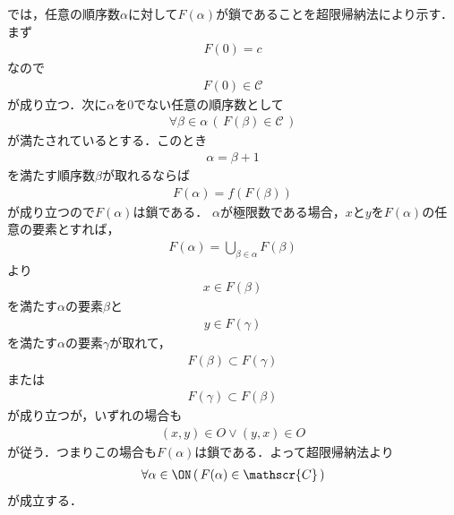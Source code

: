 \begin{sketch}
\begin{description}
				では，任意の順序数$\alpha$に対して$F(\alpha)$が鎖であることを超限帰納法により示す．まず
				\begin{align}
					F(0) = c
				\end{align}
				なので
				\begin{align}
					F(0) \in \mathscr{C}
				\end{align}
				が成り立つ．次に$\alpha$を$0$でない任意の順序数として
				\begin{align}
					\forall \beta \in \alpha\, (\, F(\beta) \in \mathscr{C}\, )
				\end{align}
				が満たされているとする．このとき
				\begin{align}
					\alpha = \beta + 1
				\end{align}
				を満たす順序数$\beta$が取れるならば
				\begin{align}
					F(\alpha) = f(F(\beta))
				\end{align}
				が成り立つので$F(\alpha)$は鎖である．
				$\alpha$が極限数である場合，$x$と$y$を$F(\alpha)$の任意の要素とすれば，
				\begin{align}
					F(\alpha) = \bigcup_{\beta \in \alpha} F(\beta)
				\end{align}
				より
				\begin{align}
					x \in F(\beta)
				\end{align}
				を満たす$\alpha$の要素$\beta$と
				\begin{align}
					y \in F(\gamma)
				\end{align}
				を満たす$\alpha$の要素$\gamma$が取れて，
				\begin{align}
					F(\beta) \subset F(\gamma)
				\end{align}
				または
				\begin{align}
					F(\gamma) \subset F(\beta)
				\end{align}
				が成り立つが，いずれの場合も
				\begin{align}
					(x,y) \in O \vee (y,x) \in O
				\end{align}
				が従う．つまりこの場合も$F(\alpha)$は鎖である．よって超限帰納法より
				\begin{align}
					\forall \alpha \in \ON\, (\, F(\alpha) \in \mathscr{C}\, )
				\end{align}
				が成立する．
				

\end{description}
\end{sketch}
